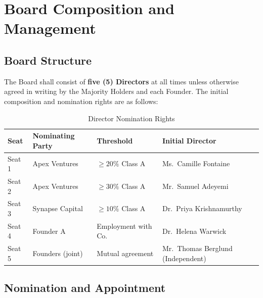 
\section{Board Composition and Management}
\label{sec:board}

\subsection{Board Structure}

The Board shall consist of \textbf{five (5) Directors} at all times unless
otherwise agreed in writing by the Majority Holders and each Founder.  The initial
composition and nomination rights are as follows:

\medskip

\begin{table}[h]
  \centering
  \caption{Director Nomination Rights}
  \label{tab:board}
  \begin{tabular}{@{} l l l p{5.2cm} @{}}
    \toprule
    \rowcolor{NavyDeep}
    \color{white}\textbf{Seat} &
    \color{white}\textbf{Nominating Party} &
    \color{white}\textbf{Threshold} &
    \color{white}\textbf{Initial Director} \\
    \midrule
    Seat 1 & Apex Ventures   & $\geq 20\%$ Class A & Ms.\ Camille Fontaine \\
    Seat 2 & Apex Ventures   & $\geq 30\%$ Class A & Mr.\ Samuel Adeyemi \\
    Seat 3 & Synapse Capital & $\geq 10\%$ Class A & Dr.\ Priya Krishnamurthy \\
    Seat 4 & Founder A       & Employment with Co. & Dr.\ Helena Warwick \\
    Seat 5 & Founders (joint)& Mutual agreement    & Mr.\ Thomas Berglund (Independent) \\
    \bottomrule
  \end{tabular}
\end{table}

\subsection{Nomination and Appointment}


